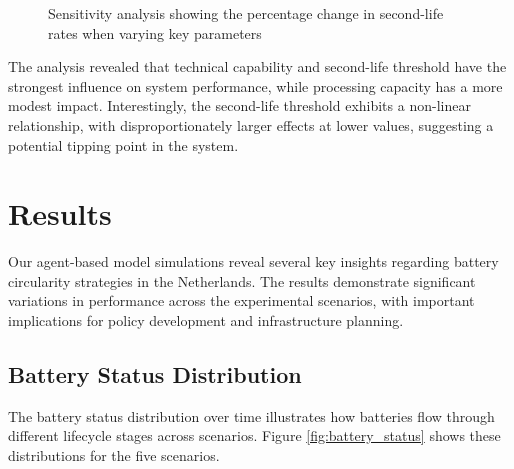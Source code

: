 \begin{figure}[ht]
\centering
{}
\caption{Sensitivity analysis showing the percentage change in second-life rates when varying key parameters}
\label{fig:sensitivity}
\end{figure}

The analysis revealed that technical capability and second-life threshold have the strongest influence on system performance, while processing capacity has a more modest impact. Interestingly, the second-life threshold exhibits a non-linear relationship, with disproportionately larger effects at lower values, suggesting a potential tipping point in the system.

\FloatBarrier
\section{Results}
Our agent-based model simulations reveal several key insights regarding battery circularity strategies in the Netherlands. The results demonstrate significant variations in performance across the experimental scenarios, with important implications for policy development and infrastructure planning.

\subsection{Battery Status Distribution}
The battery status distribution over time illustrates how batteries flow through different lifecycle stages across scenarios. Figure \ref{fig:battery_status} shows these distributions for the five scenarios.

